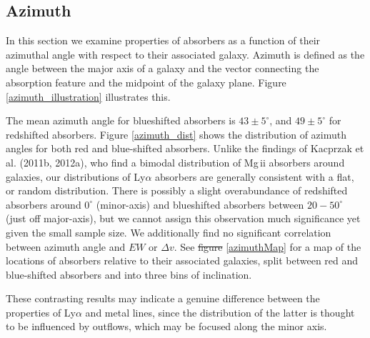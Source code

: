 \documentclass[twocolumn,tighten]{aastex6}
\providecommand{\DIFadd}[1]{{\protect\color{blue}\uwave{#1}}} %
\providecommand{\DIFdel}[1]{{\protect\color{red}\sout{#1}}}                      %
\providecommand{\DIFaddbegin}{} %
\providecommand{\DIFaddend}{} %
\providecommand{\DIFdelbegin}{} %
\providecommand{\DIFdelend}{} %
\begin{document}
\subsection{Azimuth}
\DIFaddbegin \label{azimuth}
\DIFaddend 

In this section we examine properties of absorbers as a function of their azimuthal angle with respect to their associated galaxy. Azimuth is defined as the angle between the major axis of a galaxy and the vector connecting the absorption feature and the midpoint of the galaxy plane. Figure \ref{azimuth_illustration} illustrates this. 

The mean azimuth angle for blueshifted absorbers is $43\pm5^{\circ}$, and $49\pm5^{\circ}$ for redshifted absorbers. Figure \ref{azimuth_dist} shows the distribution of azimuth angles for both red and blue-shifted absorbers. Unlike the findings of Kacprzak et al. (2011b, 2012a), who find a bimodal distribution of Mg\,{\sc ii} absorbers around galaxies, our distributions of Ly$\alpha$ absorbers are generally consistent with a flat, or random distribution. There is possibly a slight overabundance of redshifted absorbers around $0^{\circ}$ (minor-axis) and blueshifted absorbers between $20-50^{\circ}$ (just off major-axis), but we cannot assign this observation much significance yet given the small sample size. We additionally find no significant correlation between azimuth angle and $EW$ or $\Delta v$. See \DIFdelbegin \DIFdel{figure }\DIFdelend \DIFaddbegin \DIFadd{Figure }\DIFaddend \ref{azimuthMap} for a map of the locations of absorbers relative to their associated galaxies, split between red and blue-shifted absorbers and into three bins of inclination.

These contrasting results may indicate a genuine difference between the properties of Ly$\alpha$ and metal lines, since the distribution of the latter is thought to be influenced by outflows, which may be focused along the minor axis.
\end{document}
